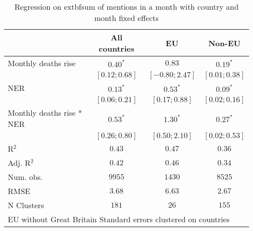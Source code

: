 
\begin{table}
\caption{Regression on 	extbf{sum of mentions} in a month with country and month fixed effects}
\begin{center}
\begin{tabular}{l c c c}
\hline
 & All countries & EU & Non-EU \\
\hline
Monthly deaths rise       & $0.40^{*}$      & $0.83$           & $0.19^{*}$      \\
                          & $ [0.12; 0.68]$ & $ [-0.80; 2.47]$ & $ [0.01; 0.38]$ \\
NER                       & $0.13^{*}$      & $0.53^{*}$       & $0.09^{*}$      \\
                          & $ [0.06; 0.21]$ & $ [ 0.17; 0.88]$ & $ [0.02; 0.16]$ \\
Monthly deaths rise * NER & $0.53^{*}$      & $1.30^{*}$       & $0.27^{*}$      \\
                          & $ [0.26; 0.80]$ & $ [ 0.50; 2.10]$ & $ [0.02; 0.53]$ \\
\hline
R$^2$                     & $0.43$          & $0.47$           & $0.36$          \\
Adj. R$^2$                & $0.42$          & $0.46$           & $0.34$          \\
Num. obs.                 & $9955$          & $1430$           & $8525$          \\
RMSE                      & $3.68$          & $6.63$           & $2.67$          \\
N Clusters                & $181$           & $26$             & $155$           \\
\hline
\multicolumn{4}{l}{\scriptsize{EU without Great Britain Standard errors clustered on countries }}
\end{tabular}
\label{table:coefficients}
\end{center}
\end{table}
